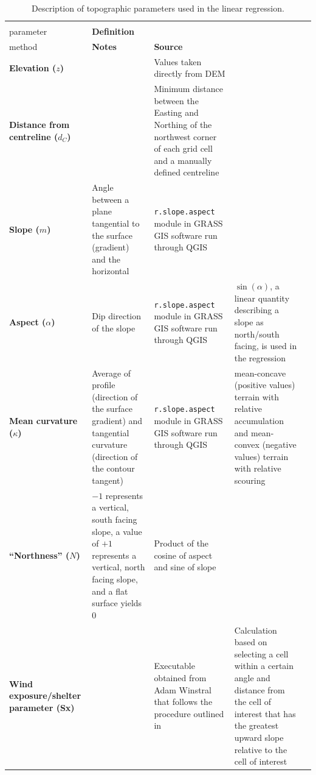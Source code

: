 \documentclass[review,oneside, letterpaper]{igs}
\begin{document}
\begin{table}[!htbp]
\centering%
\caption{Description of topographic parameters used in the linear regression.}
\label{tab:TopoParams}
\begin{tabularx}{\linewidth}{XXXXX}
\midrule
\textbf{\begin{tabular}[c]{@{}l@{}}Topographic\\ parameter\end{tabular}} & \textbf{Definition} & \textbf{\begin{tabular}[c]{@{}l@{}}Calculation \\ method\end{tabular}} & \textbf{Notes} & \textbf{Source} \\ \midrule
\textbf{Elevation ($z$)} &  & Values taken directly from DEM &  &  \\
\textbf{Distance from centreline ($d_C$)} &  & Minimum distance between the Easting and Northing of the northwest corner of each grid cell and a manually defined centreline &  &  \\
\textbf{Slope ($m$)} & Angle between a plane tangential to the surface (gradient) and the horizontal & \texttt{r.slope.aspect} module in GRASS GIS software run through QGIS &  & \cite{Mitavsova1993, Hofierka2009, Olaya2009} \\
\textbf{Aspect ($\alpha$)} & Dip direction of the slope & \texttt{r.slope.aspect} module in GRASS GIS software run through QGIS & $\sin(\alpha)$, a linear quantity describing a slope as north/south facing, is used in the regression & \cite{Mitavsova1993, Hofierka2009, Olaya2009} \\
\textbf{Mean curvature ($\kappa$)} & Average of profile (direction of the surface gradient) and tangential curvature (direction of the contour tangent) & \texttt{r.slope.aspect} module in GRASS GIS software run through QGIS & mean-concave (positive values) terrain with relative accumulation and mean-convex (negative values) terrain with relative scouring & \cite{Mitavsova1993, Hofierka2009, Olaya2009} \\
\textbf{``Northness'' ($N$)} & $-1$ represents a vertical, south facing slope, a value of $+1$ represents a vertical, north facing slope, and a flat surface yields 0 & Product of the cosine of aspect and sine of slope &  & \cite{Molotch2005} \\
\textbf{Wind exposure/shelter parameter (Sx)} &  & Executable obtained from Adam Winstral that follows the procedure outlined in \cite{Winstral2002} & Calculation based on selecting a cell within a certain angle and distance from the cell of interest that has the greatest upward slope relative to the cell of interest & \cite{Winstral2002}
\end{tabularx}
\end{table}
\end{document}
